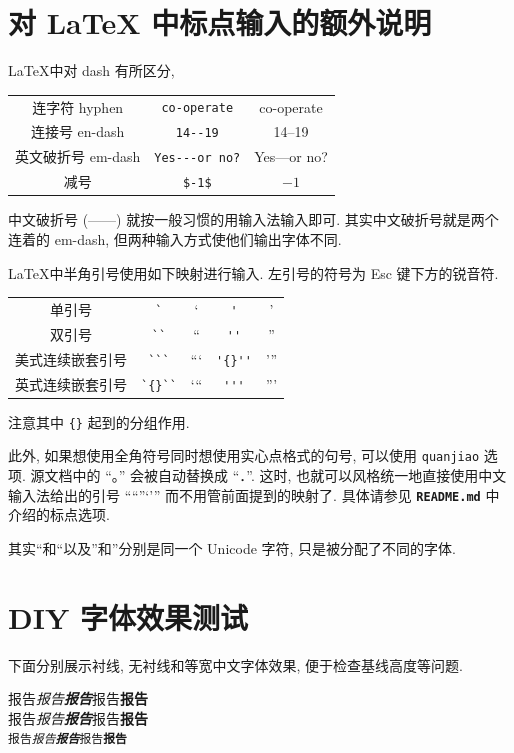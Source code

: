 \documentclass[font=default]{mpltx}
\newcommand{\note}[1]{{\color{gray}#1}}
\newcommand*\code[1]{\texttt{#1}}
\newcommand*\file[1]{\textbf{\texttt{#1}}}
\begin{document}
\section{对 \LaTeX{} 中标点输入的额外说明}
\LaTeX 中对 dash 有所区分,
\begin{center}
  \begin{tabular}{c@{\quad}c@{\ $\rightarrow$\ }c}
    连字符 hyphen    & \verb|co-operate|     & co-operate \\
    连接号 en-dash   & \verb|14--19|         & 14--19 \\
    英文破折号 em-dash & \verb|Yes---or no?| & Yes---or no? \\
    减号            & \verb|$-1$|           & $-1$ \\
  \end{tabular}
\end{center}
中文破折号 (——) 就按一般习惯的用输入法输入即可.
\note{其实中文破折号就是两个连着的 em-dash, 但两种输入方式使他们输出字体不同.}

\LaTeX 中半角引号使用如下映射进行输入.
左引号的符号为 \textsf{Esc} 键下方的锐音符.
\begin{center}
  \begin{tabular}{c@{\quad}c@{\ $\rightarrow$\ }c@{\quad}c@{\ $\rightarrow$\ }c}
    单引号      & \verb|`|     & `     & \verb|'|     & ' \\
    双引号      & \verb|``|    & ``    & \verb|''|    & '' \\
    美式连续嵌套引号 & \verb|```|   & ```   & \verb|'{}''| & '{}'' \\
    英式连续嵌套引号 & \verb|`{}``| & `{}`` & \verb|'''|   & ''' \\
  \end{tabular}
\end{center}
注意其中 \code{\{\}} 起到的分组作用.

此外, 如果想使用全角符号同时想使用实心点格式的句号, 可以使用 \code{quanjiao} 选项.
源文档中的 ``。'' 会被自动替换成 ``．''.
这时, 也就可以风格统一地直接使用中文输入法给出的引号 ``“”‘’'' 而不用管前面提到的映射了.
具体请参见 \file{README.md} 中介绍的标点选项.

\note{其实“和``以及”和''分别是同一个 Unicode 字符, 只是被分配了不同的字体.}

\section{DIY 字体效果测试}

\newcommand{\testword}{报告}
\newcommand{\andbold}{\testword{}\textbf{\testword{}}}
\newcommand{\testline}{\testword{}\emph{\andbold{}}\andbold{}}

下面分别展示衬线, 无衬线和等宽中文字体效果, 便于检查基线高度等问题.
\begin{center}
  \textrm{\testline}\\
  \textsf{\testline}\\
  \texttt{\testline}
\end{center}
\end{document}
